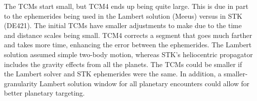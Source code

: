 \documentclass[]{aiaa-tc}%
\begin{document}
The TCMs start small, but TCM4 ends up being quite large. This is due in part to the ephemerides being used in the Lambert solution (Meeus) versus in STK (DE421). The initial TCMs have smaller adjustments to make due to the time and distance scales being small. TCM4 corrects a segment that goes much farther and takes more time, enhancing the error between the ephemerides. The Lambert solution assumed simple two-body motion, whereas STK's heliocentric propagator includes the gravity effects from all the planets. The TCMs could be smaller if the Lambert solver and STK ephemerides were the same. In addition, a smaller-granularity Lambert solution window for all planetary encounters could allow for better planetary targeting.
	
	\vspace{5 mm}
\end{document}

